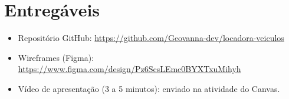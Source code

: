 \documentclass[12pt]{article}
\begin{document}
\section{Entregáveis}

\begin{itemize}
  \item Repositório GitHub: \url{https://github.com/Geovanna-dev/locadora-veiculos}
  \item Wireframes (Figma): \url{https://www.figma.com/design/Pz6ScsLEmc0BYXTxuMihyh}
  \item Vídeo de apresentação (3 a 5 minutos): enviado na atividade do Canvas.
\end{itemize}
\end{document}
